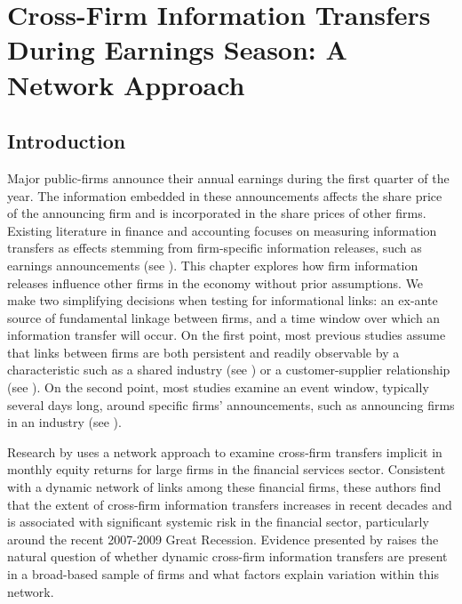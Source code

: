 \chapter{Cross-Firm Information Transfers During Earnings Season: A Network Approach} \label{Chapter:EATE}

\section{Introduction}


Major public-firms announce their annual earnings during the first quarter of the year.  The information embedded in these announcements affects the share price of the announcing firm and is incorporated in the share prices of other firms.  Existing literature in finance and accounting focuses on measuring information transfers as effects stemming from firm-specific information releases, such as earnings announcements (see \cite{Foster1981}). This chapter explores how firm information releases influence other firms in the economy without prior assumptions.   We make two simplifying decisions when testing for informational links: an ex-ante source of fundamental linkage between firms, and a time window over which an information transfer will occur.  On the first point, most previous studies assume that links between firms are both persistent and readily observable by a characteristic such as a shared industry (see \cite{Foster1981}) or a customer-supplier relationship (see \cite{OlsenDietrich1985,  AhernHarford2014}).  On the second point, most studies examine an event window, typically several days long, around specific firms' announcements, such as announcing firms in an industry (see \cite{Foster1981, ThomasZhang2008}).

Research by \cite{Billio2012} uses a network approach to examine cross-firm transfers implicit in monthly equity returns for large firms in the financial services sector.  Consistent with a dynamic network of links among these financial firms, these authors find that the extent of cross-firm information transfers increases in recent decades and is associated with significant systemic risk in the financial sector, particularly around the recent 2007-2009 Great Recession.  Evidence presented by \cite{Billio2012} raises the natural question of whether dynamic cross-firm information transfers are present in a broad-based sample of firms and what factors explain variation within this network.

